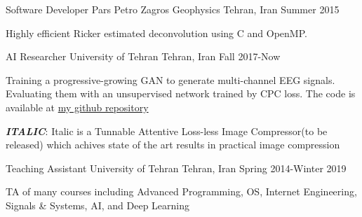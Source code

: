 \begin{cventries}
  \cventry
    {Software Developer} %
    {Pars Petro Zagros Geophysics} %
    {Tehran, Iran} %
    {Summer 2015} %
    {
      \begin{cvitems} %
        \item {Highly efficient Ricker estimated deconvolution using C and OpenMP.}
      \end{cvitems}
    }


\end{cventries}



\begin{cventries}

 \cventry
    {AI Researcher} %
    {University of Tehran} %
    {Tehran, Iran} %
    {Fall 2017-Now} %
    {
      \begin{cvitems} %
      	\item {Training a progressive-growing GAN to generate multi-channel EEG signals. Evaluating them with an unsupervised network trained by CPC loss. The code is available at \href{https://github.com/Separius/EEG-GAN}{my github repository}}      
      	\item {\textbf{\textit{ITALIC}}: Italic is a Tunnable Attentive Loss-less Image Compressor(to be released) which achives state of the art results in practical image compression}
      \end{cvitems}
    }

 \cventry
    {Teaching Assistant} %
    {University of Tehran} %
    {Tehran, Iran} %
    {Spring 2014-Winter 2019} %
    {
      \begin{cvitems} %
        \item {TA of many courses including Advanced Programming, OS, Internet Engineering, Signals \& Systems, AI, and Deep Learning}
      \end{cvitems}
    }
\end{cventries}
